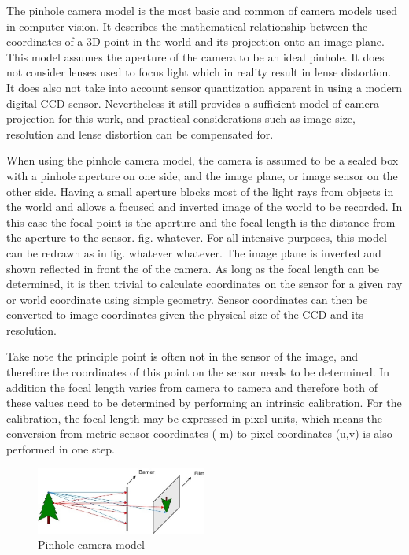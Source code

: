 The pinhole camera model is the most basic and common of camera models used in computer vision.  It
describes the mathematical relationship between the coordinates of a 3D point in the world and its
projection onto an image plane.  This model assumes the aperture of the camera to be an ideal
pinhole. It does not consider lenses used to focus light which in reality result in lense
distortion.  It does also not take into account sensor quantization apparent in using a modern
digital CCD sensor. Nevertheless it still provides a sufficient model of camera projection for this
work, and practical considerations such as image size, resolution and lense distortion can be
compensated for.

When using the pinhole camera model, the camera is assumed to be a sealed box with a pinhole
aperture on one side, and the image plane, or image sensor on the other side.  Having a small
aperture blocks most of the light rays from objects in the world and allows a focused and inverted
image of the world to be recorded. In this case the focal point is the aperture and the focal length
is the distance from the aperture to the sensor. fig. whatever. For all intensive purposes,
this model can be redrawn as in fig. whatever whatever. The image plane is inverted and shown
reflected in front the of the camera.  As long as the focal length can be determined, it is then
trivial to calculate coordinates on the sensor for a given ray or world coordinate using simple
geometry. Sensor coordinates can then be converted to image coordinates given the physical size
of the CCD and its resolution.  

Take note the principle point is often not in the sensor of the image, and therefore the
coordinates of this point on the sensor needs to be determined.  In addition the focal length
varies from camera to camera and therefore both of these values need to be determined by performing
an intrinsic calibration. For the calibration, the focal length may be expressed in pixel units,
which means the conversion from metric sensor coordinates ( m) to pixel coordinates (u,v) is
also performed in one step.


\begin{figure}[h!]
  \centering
    \includegraphics[width=0.5\textwidth]{chapters/images/cam_model_fig2}
  \caption{Pinhole camera model}
\end{figure}

